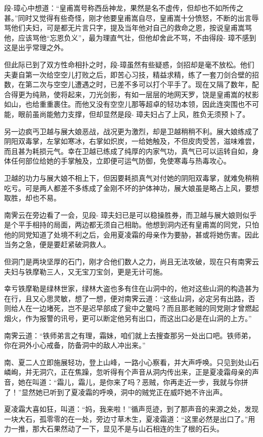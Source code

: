 \documentclass[12pt,oneside]{book}
\begin{document}
段-璋心中想道：``皇甫嵩号称西岳神龙，果然是名不虚传，但却也不如所传之甚。''同时又觉得有些奇怪，刚才他要皇甫嵩自尽，皇甫嵩十分愤怒，不断的出言辱骂他们夫妇，可是都无片言只字，提及当年他对自己的救命之恩，按说皇甫嵩骂他，应该骂他``忘恩负义''，最为理直气壮，但他却舍此不骂，不由得段-
璋不感到这是出乎常理之外。

但此际已到了双方性命相扑之时，段-璋虽然有些疑惑，剑招却是毫不放松。他们夫妻自第一次给空空儿打败之后，即苦心习技，精益求精，练了一套刀剑合壁的招数，在第二次与空空儿遭遇之时，已差不多可以打个平手了。现在又隔了数年，配合得更为纯熟，使将起来，刀光剑影，有如一层层的地网天罗，饶是皇甫嵩的杖影如山，也给重重裹住。而他又没有空空儿那等超卓的轻功本领，因此连突围也不可能，眼前虽尚能勉力支撑，但却显然是段-
璋夫妇占了上风，胜负无须预卜了。

另一边疯丐卫越与展大娘恶战，战况更为激烈，却是卫越稍稍不利。展大娘练成了阴阳双毒掌，左掌如寒冰，右掌如炽炭，一给她触及，不但皮肉受苦，滋味难尝，而且甚为耗损元气。幸在卫越已练成了纯厚的内家气功，真气已可以运转自如，身体任何部位给她的手掌触及，立即便可运气防御，免使寒毒与热毒攻心。

卫越的功力与展大娘不相上下，但因要耗损真气对付她的阴阳双毒掌，就难免稍稍吃亏。可是两人都差不多练成了金刚不坏的护体神功，展大娘虽是略占上风，要想取胜，却也不易。

南霁云在旁边看了一会，见段-
璋夫妇已是可以稳操胜券，而卫越与展大娘则似乎是个平手相持的局面，两边都无须自己相助。他想到洞内还有皇甫嵩的同党，只怕他的同党知道了处境不利之后，会用夏凌霜的母亲作为要胁，甚或将她伤害。因此当务之急，便是要赶紧破洞救人。

但洞门是两块坚厚的石门，刚才合他们数人之力，尚且无法攻破，现在只有南霁云夫妇与铁摩勒三人，又无宝刀宝剑，更是无计可施。

幸亏铁摩勒是绿林世家，绿林大盗也多有住在山洞中的，他对这些山洞的构造甚为在行，且又心思灵敏，想了一想，便对南霁云道：``这些山洞，必定另有出路，否则给人在一边堵死，岂不是迟早部成了瓮中之鳖吗？而且那老贼的同党刚才曾燃起烟火，作为报警的讯号，更可以断定他另有出口，而这出口必是在山洞的上方。''

南霁云道：``铁师弟言之有理，霜妹，咱们就上去搜查那另一处出口吧。铁师弟，你在洞外小心戒备，防备洞中的敌人冲出来。''

南、夏二人立即施展轻功，登上山峰，一路小心察看，并大声呼唤。只见到处山石嶙峋，并无洞穴，正在焦躁，忽听得有个声音从洞内传出来，正是夏凌霜母亲的声音，她在叫道：``霜儿，霜儿，是你来了吗？恶贼，你再走近一步，我就与你拼了！''显然她已听到了夏凌霜的呼唤，洞中的贼党正在威吓她不许出声。

夏凌霜大喜如狂，叫道：``妈，我来啦！''循声觅迹，到了那声音的来源之处，发现一块大石，孤零零的在一处，旁边寸草木生，夏凌霜道：``这里必然是出口了。''用力一推，那大石果然动了一下，显见不是与山石相连的生了根的石头。
\end{document}
